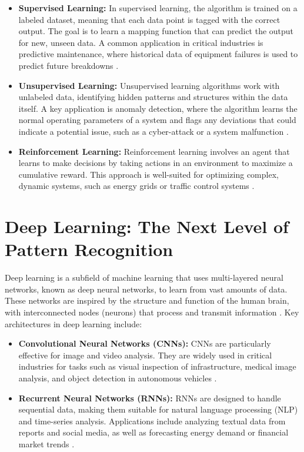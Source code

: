 \begin{itemize}
    \item \textbf{Supervised Learning:} In supervised learning, the algorithm is trained on a labeled dataset, meaning that each data point is tagged with the correct output. The goal is to learn a mapping function that can predict the output for new, unseen data. A common application in critical industries is predictive maintenance, where historical data of equipment failures is used to predict future breakdowns \parencite{Sarker2021MachineLearning}.
    \item \textbf{Unsupervised Learning:} Unsupervised learning algorithms work with unlabeled data, identifying hidden patterns and structures within the data itself. A key application is anomaly detection, where the algorithm learns the normal operating parameters of a system and flags any deviations that could indicate a potential issue, such as a cyber-attack or a system malfunction \parencite{Chandola2009}.
    \item \textbf{Reinforcement Learning:} Reinforcement learning involves an agent that learns to make decisions by taking actions in an environment to maximize a cumulative reward. This approach is well-suited for optimizing complex, dynamic systems, such as energy grids or traffic control systems \parencite{SuttonBarto2018}.
\end{itemize}

\section{Deep Learning: The Next Level of Pattern Recognition}
\label{sec:deep_learning}
Deep learning is a subfield of machine learning that uses multi-layered neural networks, known as deep neural networks, to learn from vast amounts of data. These networks are inspired by the structure and function of the human brain, with interconnected nodes (neurons) that process and transmit information \parencite{LeCun2015DeepLearning}. Key architectures in deep learning include:

\begin{itemize}
    \item \textbf{Convolutional Neural Networks (CNNs):} CNNs are particularly effective for image and video analysis. They are widely used in critical industries for tasks such as visual inspection of infrastructure, medical image analysis, and object detection in autonomous vehicles \parencite{Krizhevsky2012}.
    \item \textbf{Recurrent Neural Networks (RNNs):} RNNs are designed to handle sequential data, making them suitable for natural language processing (NLP) and time-series analysis. Applications include analyzing textual data from reports and social media, as well as forecasting energy demand or financial market trends \parencite{Hochreiter1997}.
\end{itemize}

